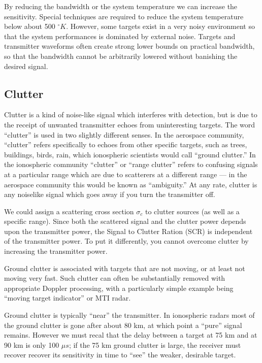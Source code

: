 By reducing the bandwidth or the system temperature we can increase
the sensitivity. Special techniques are required to reduce the system
temperature below about 500 $^\circ K$.  However, some targets exist
in a very noisy environment so that the system performances is
dominated by external noise.  Targets and transmitter waveforms often
create strong lower bounds on practical bandwidth, so that the
bandwidth cannot be arbitrarily lowered without banishing the desired
signal.

\subsection{Clutter}

Clutter is a kind of noise-like signal which interferes with
detection, but is due to the receipt of unwanted transmitter echoes
from uninteresting targets.  The word ``clutter'' is used in two
slightly different senses.  In the aerospace community, ``clutter''
refers specifically to echoes from other specific targets, such as
trees, buildings, birds, rain, which ionospheric scientists would call
``ground clutter.''  In the ionospheric community ``clutter'' or
``range clutter'' refers to confusing signals at a particular range
which are due to scatterers at a different range --- in the aerospace
community this would be known as ``ambiguity.''  At any rate, clutter
is any noiselike signal which goes away if you turn the transmitter
off.  

We could assign a scattering cross section $\sigma_c$ to clutter
sources (as well as a specific range).  Since both the scattered
signal and the clutter power depends upon the transmitter power, the
Signal to Clutter Ration (SCR) is independent of the transmitter
power.  To put it differently, you cannot overcome clutter by
increasing the transmitter power.

Ground clutter is associated with targets that are not moving, or at
least not moving very fast.  Such clutter can often be substantially
removed with appropriate Doppler processing, with a particularly
simple example being ``moving target indicator'' or MTI radar.

Ground clutter is typically ``near'' the transmitter.  In ionospheric
radars most of the ground clutter is gone after about 80 km, at which
point a ``pure'' signal remains.  However we must recal that the delay
between a target at 75 km and at 90 km is only 100 $\mu s$; if the 75
km ground clutter is large, the receiver must recover recover its
sensitivity in time to ``see'' the weaker, desirable target.

